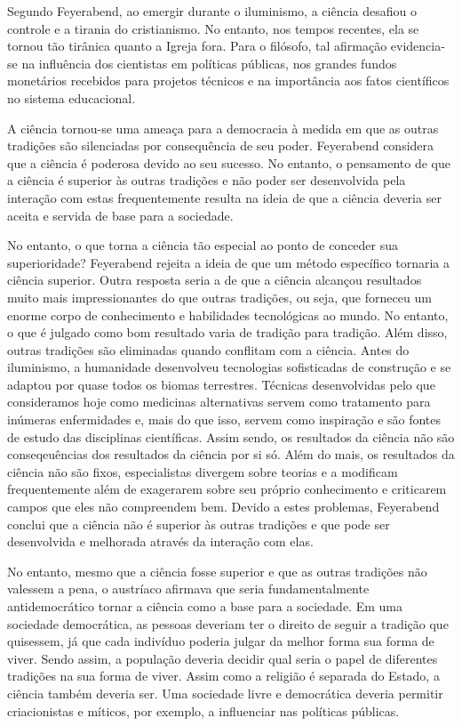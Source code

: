 \documentclass[12pt]{report}
\begin{document}
			Segundo Feyerabend, ao emergir durante o iluminismo, a ciência desafiou o controle e a tirania do cristianismo. No entanto, nos tempos recentes, ela se tornou tão tirânica quanto a Igreja fora. Para o filósofo, tal afirmação evidencia-se na influência dos cientistas em políticas públicas, nos grandes fundos monetários recebidos para projetos técnicos e na importância aos fatos científicos no sistema educacional.
		
			A ciência tornou-se uma ameaça para a democracia à medida em que as outras tradições são silenciadas por consequência de seu poder. Feyerabend considera que a ciência é poderosa devido ao seu sucesso. No entanto, o pensamento de que a ciência é superior às outras tradições e não poder ser desenvolvida pela interação com estas frequentemente resulta na ideia de que a ciência deveria ser aceita e servida de base para a sociedade.
		
			No entanto, o que torna a ciência tão especial ao ponto de conceder sua superioridade? Feyerabend rejeita a ideia de que um método específico tornaria a ciência superior. Outra resposta seria a de que a ciência alcançou resultados muito mais impressionantes do que outras tradições, ou seja, que forneceu um enorme corpo de conhecimento e habilidades tecnológicas ao mundo. No entanto, o que é julgado como bom resultado varia de tradição para tradição. Além disso, outras tradições são eliminadas quando conflitam com a ciência. Antes do iluminismo, a humanidade desenvolveu tecnologias sofisticadas de construção e se adaptou por quase todos os biomas terrestres. Técnicas desenvolvidas pelo que consideramos hoje como medicinas alternativas servem como tratamento para inúmeras enfermidades e, mais do que isso, servem como inspiração e são fontes de estudo das disciplinas científicas. Assim sendo, os resultados da ciência não são conseqeuências dos resultados da ciência por si só. Além do mais, os resultados da ciência não são fixos, especialistas divergem sobre teorias e a modificam frequentemente além de exagerarem sobre seu próprio conhecimento e criticarem campos que eles não compreendem bem. Devido a estes problemas, Feyerabend conclui que a ciência não é superior às outras tradições e que pode ser desenvolvida e melhorada através da interação com elas.
			
			No entanto, mesmo que a ciência fosse superior e que as outras tradições não valessem a pena, o austríaco afirmava que seria fundamentalmente antidemocrático tornar a ciência como a base para a sociedade. Em uma sociedade democrática, as pessoas deveriam ter o direito de seguir a tradição que quisessem, já que cada indivíduo poderia julgar da melhor forma sua forma de viver. Sendo assim, a população deveria decidir qual seria o papel de diferentes tradições na sua forma de viver. Assim como a religião é separada do Estado, a ciência também deveria ser. Uma sociedade livre e democrática deveria permitir criacionistas e míticos, por exemplo, a influenciar nas políticas públicas.
		
\end{document}
